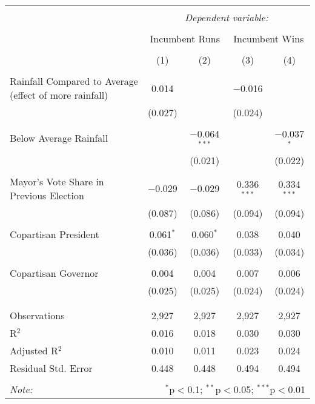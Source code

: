 
\begin{tabular}{@{\extracolsep{5pt}}lcccc} 
\\[-1.8ex]\hline 
\hline \\[-1.8ex] 
 & \multicolumn{4}{c}{\textit{Dependent variable:}} \\ 
\cline{2-5} 
\\[-1.8ex] & \multicolumn{2}{c}{Incumbent Runs} & \multicolumn{2}{c}{Incumbent Wins} \\ 
\\[-1.8ex] & (1) & (2) & (3) & (4)\\ 
\hline \\[-1.8ex] 
 Rainfall Compared to Average (effect of more rainfall) & 0.014 &  & $-$0.016 &  \\ 
  & (0.027) &  & (0.024) &  \\ 
  & & & & \\ 
 Below Average Rainfall &  & $-$0.064$^{***}$ &  & $-$0.037$^{*}$ \\ 
  &  & (0.021) &  & (0.022) \\ 
  & & & & \\ 
 Mayor's Vote Share in Previous Election & $-$0.029 & $-$0.029 & 0.336$^{***}$ & 0.334$^{***}$ \\ 
  & (0.087) & (0.086) & (0.094) & (0.094) \\ 
  & & & & \\ 
 Copartisan President & 0.061$^{*}$ & 0.060$^{*}$ & 0.038 & 0.040 \\ 
  & (0.036) & (0.036) & (0.033) & (0.034) \\ 
  & & & & \\ 
 Copartisan Governor & 0.004 & 0.004 & 0.007 & 0.006 \\ 
  & (0.025) & (0.025) & (0.024) & (0.024) \\ 
  & & & & \\ 
\hline \\[-1.8ex] 
Observations & 2,927 & 2,927 & 2,927 & 2,927 \\ 
R$^{2}$ & 0.016 & 0.018 & 0.030 & 0.030 \\ 
Adjusted R$^{2}$ & 0.010 & 0.011 & 0.023 & 0.024 \\ 
Residual Std. Error & 0.448 & 0.448 & 0.494 & 0.494 \\ 
\hline 
\hline \\[-1.8ex] 
\textit{Note:}  & \multicolumn{4}{r}{$^{*}$p$<$0.1; $^{**}$p$<$0.05; $^{***}$p$<$0.01} \\ 
\end{tabular} 
